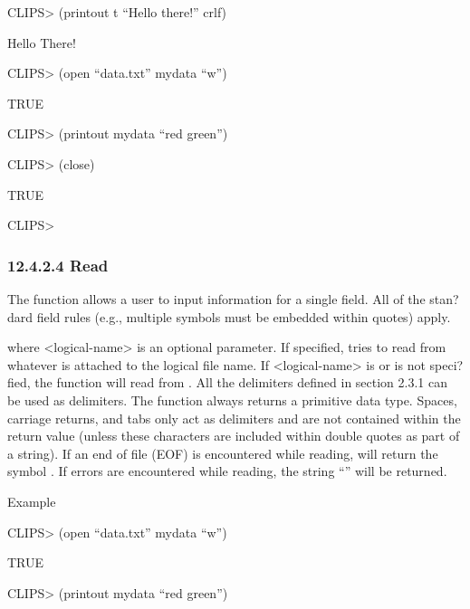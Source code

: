 \documentclass[letterpaper,10pt,english]{sphinxmanual}
\begin{document}
CLIPS\textgreater{} (printout t “Hello there!” crlf)

Hello There!

CLIPS\textgreater{} (open “data.txt” mydata “w”)

TRUE

CLIPS\textgreater{} (printout mydata “red green”)

CLIPS\textgreater{} (close)

TRUE

CLIPS\textgreater{}


\subsubsection{12.4.2.4 Read}
\label{\detokenize{actions:read}}
The  function allows a user to input information for a single
field. All of the stan?dard field rules (e.g., multiple symbols must be
embedded within quotes) apply.


\begin{sphinxVerbatim}[commandchars=\\\{\}]
 \PYG{p}{[}\PYG{p}{]}
\end{sphinxVerbatim}

where \textless{}logical-name\textgreater{} is an optional parameter. If specified, 
tries to read from whatever is attached to the logical file name. If
\textless{}logical-name\textgreater{} is  or is not speci?fied, the function will read
from . All the delimiters defined in section 2.3.1 can be used
as delimiters. The  function always returns a primitive data
type. Spaces, carriage returns, and tabs only act as delimiters and are
not contained within the return value (unless these characters are
included within double quotes as part of a string). If an end of file
(EOF) is encountered while reading,  will return the symbol
. If errors are encountered while reading, the string “” will be returned.

Example

CLIPS\textgreater{} (open “data.txt” mydata “w”)

TRUE

CLIPS\textgreater{} (printout mydata “red green”)
\end{document}
